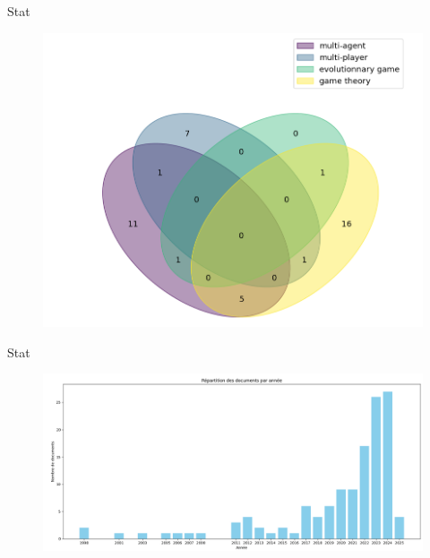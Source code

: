 \documentclass[aspectratio=169,xcolor=dvipsnames]{beamer}
\begin{document}
\begin{frame}{Stat}
  \begin{figure}
    \centering
    \includegraphics[scale=0.20]{venn.png}
    \caption{}
  \end{figure}
\end{frame}

\begin{frame}{Stat}
  \begin{figure}
    \centering
    \includegraphics[scale=0.20]{Annee.png}
    \caption{}
  \end{figure}
\end{frame}
\end{document}
